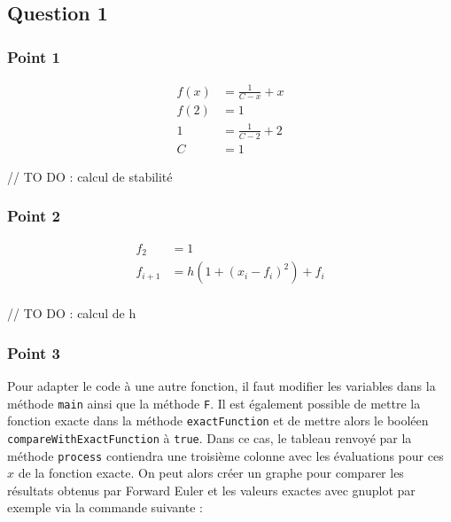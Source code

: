 \subsection{Question 1}

\subsubsection{Point 1}

\begin{equation}
	\begin{aligned}
		f(x) &= \frac{1}{C - x} + x\\
		f(2) &= 1\\
		1 &= \frac{1}{C - 2} + 2\\
		C &= 1
	\end{aligned}
\end{equation}

// TO DO : calcul de stabilité

\subsubsection{Point 2}

\begin{equation}
	\begin{aligned}
		f_2 &= 1\\
		f_{i+1} &= h(1 + (x_i - f_i)^2)+f_i\\
	\end{aligned}
\end{equation}

// TO DO : calcul de h

\subsubsection{Point 3}


Pour adapter le code à une autre fonction, il faut modifier les variables dans la méthode \texttt{main} ainsi que la méthode \texttt{F}. Il est également possible de mettre la fonction exacte dans la méthode \texttt{exactFunction} et de mettre alors le booléen \texttt{compareWithExactFunction} à \texttt{true}. Dans ce cas, le tableau renvoyé par la méthode \texttt{process} contiendra une troisième colonne avec les évaluations pour ces $x$ de la fonction exacte. On peut alors créer un graphe pour comparer les résultats obtenus par Forward Euler et les valeurs exactes avec gnuplot par exemple via la commande suivante :

